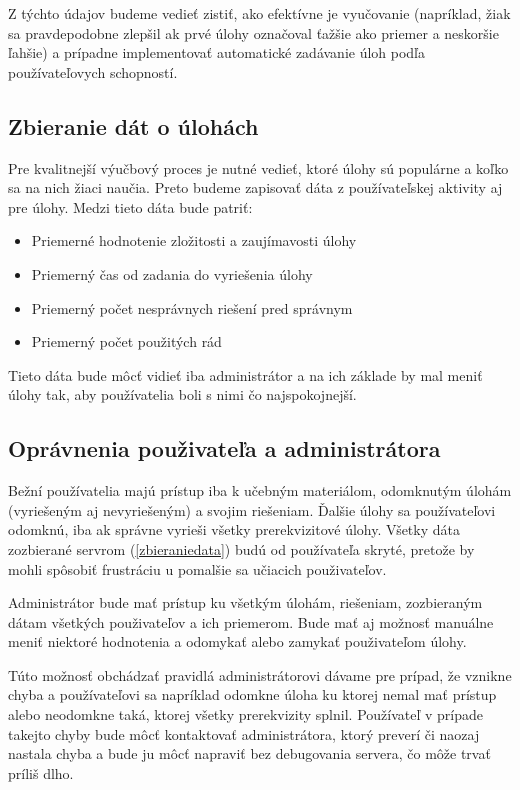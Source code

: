 Z týchto údajov budeme vedieť zistiť, ako efektívne je vyučovanie (napríklad, žiak sa pravdepodobne zlepšil ak prvé úlohy označoval ťažšie ako priemer a neskoršie ľahšie) a prípadne implementovať automatické zadávanie úloh podľa používateľovych schopností.

\subsection{Zbieranie dát o úlohách}
Pre kvalitnejší výučbový proces je nutné vedieť, ktoré úlohy sú populárne a koľko
sa na nich žiaci naučia. Preto budeme zapisovať dáta z používateľskej aktivity aj pre
úlohy. Medzi tieto dáta bude patriť:
\begin{itemize}
\item Priemerné hodnotenie zložitosti a zaujímavosti úlohy
\item Priemerný čas od zadania do vyriešenia úlohy
\item Priemerný počet nesprávnych riešení pred správnym
\item Priemerný počet použitých rád
\end{itemize}

Tieto dáta bude môcť vidieť iba administrátor a na ich základe by mal meniť úlohy
tak, aby používatelia boli s nimi čo najspokojnejší.

\subsection{Oprávnenia použivateľa a administrátora}
Bežní používatelia majú prístup iba k učebným materiálom, odomknutým úlohám (vyriešeným aj nevyriešeným) a svojim riešeniam. Ďalšie úlohy sa používateľovi odomknú, iba ak správne vyrieši všetky prerekvizitové úlohy. Všetky dáta zozbierané servrom (\ref{zbieraniedata}) budú od používateľa skryté, pretože by mohli spôsobiť frustráciu u pomalšie sa učiacich použivateľov.

Administrátor bude mať prístup ku všetkým úlohám, riešeniam, zozbieraným dátam všetkých použivateľov a ich priemerom. Bude mať aj možnosť manuálne meniť niektoré hodnotenia a odomykať alebo zamykať použivateľom úlohy.

Túto možnosť obchádzať pravidlá administrátorovi dávame pre prípad, že vznikne chyba a používateľovi sa napríklad odomkne úloha ku ktorej nemal mať prístup alebo neodomkne taká, ktorej všetky prerekvizity splnil. Používateľ v prípade takejto chyby bude môcť kontaktovať administrátora, ktorý preverí či naozaj nastala chyba a bude ju môcť napraviť bez debugovania servera, čo môže trvať príliš dlho.
